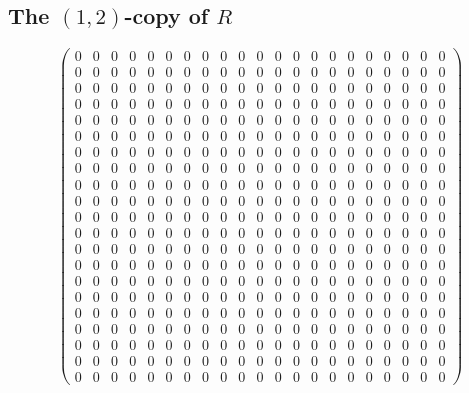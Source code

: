 \documentclass{article}
\begin{document}
\subsection{The $ \left(1, 2\right) $-copy of $R$}
\[ \left(\begin{array}{rrrrrrrrrrrrrrrrrrrrr}
0 & 0 & 0 & 0 & 0 & 0 & 0 & 0 & 0 & 0 & 0 & 0 & 0 & 0 & 0 & 0 & 0 & 0 & 0 & 0 & 0 \\
0 & 0 & 0 & 0 & 0 & 0 & 0 & 0 & 0 & 0 & 0 & 0 & 0 & 0 & 0 & 0 & 0 & 0 & 0 & 0 & 0 \\
0 & 0 & 0 & 0 & 0 & 0 & 0 & 0 & 0 & 0 & 0 & 0 & 0 & 0 & 0 & 0 & 0 & 0 & 0 & 0 & 0 \\
0 & 0 & 0 & 0 & 0 & 0 & 0 & 0 & 0 & 0 & 0 & 0 & 0 & 0 & 0 & 0 & 0 & 0 & 0 & 0 & 0 \\
0 & 0 & 0 & 0 & 0 & 0 & 0 & 0 & 0 & 0 & 0 & 0 & 0 & 0 & 0 & 0 & 0 & 0 & 0 & 0 & 0 \\
0 & 0 & 0 & 0 & 0 & 0 & 0 & 0 & 0 & 0 & 0 & 0 & 0 & 0 & 0 & 0 & 0 & 0 & 0 & 0 & 0 \\
0 & 0 & 0 & 0 & 0 & 0 & 0 & 0 & 0 & 0 & 0 & 0 & 0 & 0 & 0 & 0 & 0 & 0 & 0 & 0 & 0 \\
0 & 0 & 0 & 0 & 0 & 0 & 0 & 0 & 0 & 0 & 0 & 0 & 0 & 0 & 0 & 0 & 0 & 0 & 0 & 0 & 0 \\
0 & 0 & 0 & 0 & 0 & 0 & 0 & 0 & 0 & 0 & 0 & 0 & 0 & 0 & 0 & 0 & 0 & 0 & 0 & 0 & 0 \\
0 & 0 & 0 & 0 & 0 & 0 & 0 & 0 & 0 & 0 & 0 & 0 & 0 & 0 & 0 & 0 & 0 & 0 & 0 & 0 & 0 \\
0 & 0 & 0 & 0 & 0 & 0 & 0 & 0 & 0 & 0 & 0 & 0 & 0 & 0 & 0 & 0 & 0 & 0 & 0 & 0 & 0 \\
0 & 0 & 0 & 0 & 0 & 0 & 0 & 0 & 0 & 0 & 0 & 0 & 0 & 0 & 0 & 0 & 0 & 0 & 0 & 0 & 0 \\
0 & 0 & 0 & 0 & 0 & 0 & 0 & 0 & 0 & 0 & 0 & 0 & 0 & 0 & 0 & 0 & 0 & 0 & 0 & 0 & 0 \\
0 & 0 & 0 & 0 & 0 & 0 & 0 & 0 & 0 & 0 & 0 & 0 & 0 & 0 & 0 & 0 & 0 & 0 & 0 & 0 & 0 \\
0 & 0 & 0 & 0 & 0 & 0 & 0 & 0 & 0 & 0 & 0 & 0 & 0 & 0 & 0 & 0 & 0 & 0 & 0 & 0 & 0 \\
0 & 0 & 0 & 0 & 0 & 0 & 0 & 0 & 0 & 0 & 0 & 0 & 0 & 0 & 0 & 0 & 0 & 0 & 0 & 0 & 0 \\
0 & 0 & 0 & 0 & 0 & 0 & 0 & 0 & 0 & 0 & 0 & 0 & 0 & 0 & 0 & 0 & 0 & 0 & 0 & 0 & 0 \\
0 & 0 & 0 & 0 & 0 & 0 & 0 & 0 & 0 & 0 & 0 & 0 & 0 & 0 & 0 & 0 & 0 & 0 & 0 & 0 & 0 \\
0 & 0 & 0 & 0 & 0 & 0 & 0 & 0 & 0 & 0 & 0 & 0 & 0 & 0 & 0 & 0 & 0 & 0 & 0 & 0 & 0 \\
0 & 0 & 0 & 0 & 0 & 0 & 0 & 0 & 0 & 0 & 0 & 0 & 0 & 0 & 0 & 0 & 0 & 0 & 0 & 0 & 0 \\
0 & 0 & 0 & 0 & 0 & 0 & 0 & 0 & 0 & 0 & 0 & 0 & 0 & 0 & 0 & 0 & 0 & 0 & 0 & 0 & 0
\end{array}\right) \]
\end{document}

